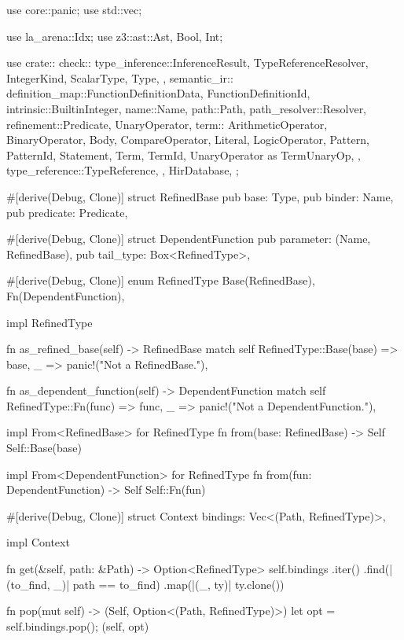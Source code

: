 \documentclass[
  oneside,
  english,
  coorientadorbanca,
  noabntexcite
]{ufsc-thesis-rn46-2019}
\begin{document}
\begin{rustcode}
use core::panic;
use std::vec;

use la_arena::Idx;
use z3::ast::{Ast, Bool, Int};

use crate::{
    check::{
        type_inference::{InferenceResult, TypeReferenceResolver},
        IntegerKind, ScalarType, Type,
    },
    semantic_ir::{
        definition_map::{FunctionDefinitionData, FunctionDefinitionId},
        intrinsic::BuiltinInteger,
        name::Name,
        path::Path,
        path_resolver::Resolver,
        refinement::{Predicate, UnaryOperator},
        term::{
            ArithmeticOperator, BinaryOperator, Body, CompareOperator, Literal, LogicOperator,
            Pattern, PatternId, Statement, Term, TermId, UnaryOperator as TermUnaryOp,
        },
        type_reference::TypeReference,
    },
    HirDatabase,
};

#[derive(Debug, Clone)]
struct RefinedBase {
    pub base: Type,
    pub binder: Name,
    pub predicate: Predicate,
}

#[derive(Debug, Clone)]
struct DependentFunction {
    pub parameter: (Name, RefinedBase),
    pub tail_type: Box<RefinedType>,
}

#[derive(Debug, Clone)]
enum RefinedType {
    Base(RefinedBase),
    Fn(DependentFunction),
}

impl RefinedType {
    fn as_refined_base(self) -> RefinedBase {
        match self {
            RefinedType::Base(base) => base,
            _ => panic!("Not a RefinedBase."),
        }
    }

    fn as_dependent_function(self) -> DependentFunction {
        match self {
            RefinedType::Fn(func) => func,
            _ => panic!("Not a DependentFunction."),
        }
    }
}

impl From<RefinedBase> for RefinedType {
    fn from(base: RefinedBase) -> Self {
        Self::Base(base)
    }
}

impl From<DependentFunction> for RefinedType {
    fn from(fun: DependentFunction) -> Self {
        Self::Fn(fun)
    }
}

#[derive(Debug, Clone)]
struct Context {
    bindings: Vec<(Path, RefinedType)>,
}

impl Context {
    fn get(&self, path: &Path) -> Option<RefinedType> {
        self.bindings
            .iter()
            .find(|(to_find, _)| path == to_find)
            .map(|(_, ty)| ty.clone())
    }

    fn pop(mut self) -> (Self, Option<(Path, RefinedType)>) {
        let opt = self.bindings.pop();
        (self, opt)
    }
}


\end{rustcode}
\end{document}
